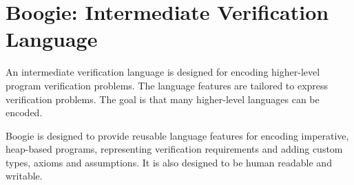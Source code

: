 \section{Boogie: Intermediate Verification Language}
\begin{mytitle} An intermediate verification language is designed for encoding higher-level program verification problems. The language features are tailored to express verification problems. The goal is that many higher-level languages can be encoded.
\end{mytitle}
\begin{mytitle} Boogie is designed to provide reusable language features for encoding imperative, heap-based programs, representing verification requirements and adding custom types, axioms and assumptions. It is also designed to be human readable and writable. 
\end{mytitle}

